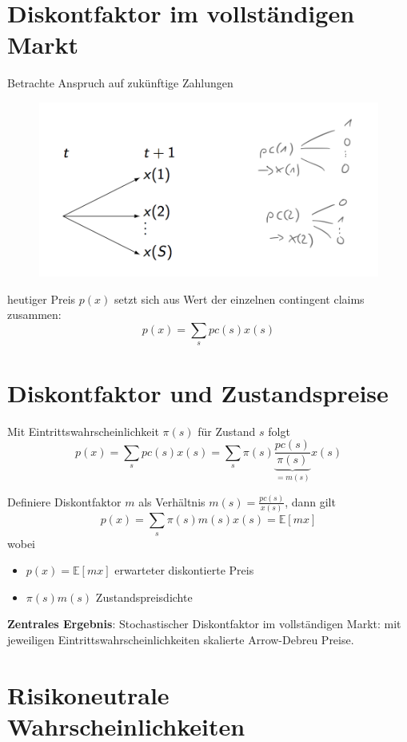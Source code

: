 \documentclass[12pt]{extreport} %
\theoremstyle{named}
\theoremstyle{nnamed}
\theoremstyle{itshape}
\theoremstyle{normal}
\begin{document}
\section{Diskontfaktor im vollständigen Markt}

Betrachte Anspruch auf zukünftige Zahlungen

\begin{figure}[h!] \centering
	\includegraphics[scale=0.5]{img/p66}
\end{figure}

heutiger Preis $p(x)$ setzt sich aus Wert der einzelnen contingent claims zusammen:
	$$ p(x) = \sum_s pc(s) x(s) $$

\section*{Diskontfaktor und Zustandspreise}
	
Mit Eintrittswahrscheinlichkeit $\pi(s)$ für Zustand $s$ folgt
	$$ p(x) = \sum_s pc(s) x(s) = \sum_s \pi(s) \underbrace{\frac{pc(s)}{\pi(s)}}_{= m(s)} x(s) $$

Definiere Diskontfaktor $m$ als Verhältnis $m(s) = \frac{pc(s)}{x(s)}$, dann gilt
	$$ p(x) = \sum_s \pi(s) m(s) x(s) = \mathbb{E}[mx] $$
wobei
\begin{itemize}
	\item $p(x) = \mathbb{E}[mx]$ erwarteter diskontierte Preis
	\item $\pi(s) m(s)$ Zustandspreisdichte
\end{itemize}	
	
\textbf{Zentrales Ergebnis}: Stochastischer Diskontfaktor im vollständigen Markt: mit jeweiligen Eintrittswahrscheinlichkeiten skalierte Arrow-Debreu Preise.

\section{Risikoneutrale Wahrscheinlichkeiten}
\end{document}
